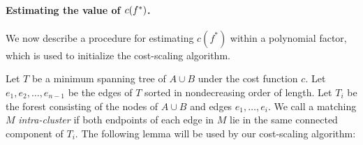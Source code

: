 \documentclass[11pt]{article}
\def\cost{c}
\theoremstyle{plain}
\numberwithin{figure}{section}
\def\EMPH#1{\textcolor{BrickRed}{{\emph{#1}}}}
\begin{document}
\paragraph*{Estimating the value of \textbf{$\boldmath \cost(f^*)$}.}
We now describe a procedure for estimating $\cost(f^*)$ within a polynomial factor,
which is used to initialize the cost-scaling algorithm.

Let \EMPH{$T$} be a minimum spanning tree of $A \cup B$ under the cost function $c$.
Let $e_1, e_2, \ldots, e_{n-1}$ be the edges of $T$ sorted in nondecreasing order
of length.
Let \EMPH{$T_i$} be the forest consisting of the nodes of $A \cup B$ and
edges $e_1, \ldots, e_i$.
We call a matching $M$ \EMPH{intra-cluster} if both endpoints of
each edge in $M$ lie in the same connected component of $T_i$.
%
The following lemma will be used by our cost-scaling algorithm:
\end{document}
